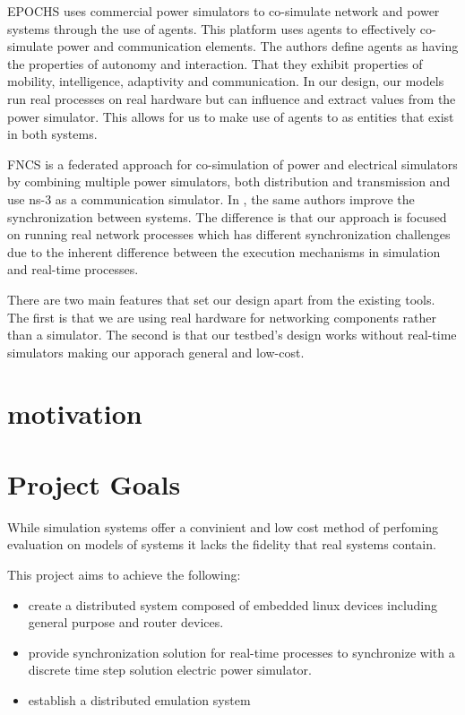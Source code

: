 EPOCHS \cite{EPOCHS} uses commercial power simulators to co-simulate network and power systems through the use of agents.
This platform uses agents to effectively co-simulate power and communication elements.
The authors define agents as having the properties of autonomy and interaction.
That they exhibit properties of mobility, intelligence, adaptivity and communication.
In our design, our models run real processes on real hardware but can influence and extract values from the power simulator.
This allows for us to make use of agents to as entities that exist in both systems.

FNCS \cite{FNCS} is a federated approach for co-simulation of power and electrical simulators by combining multiple power simulators, both distribution and transmission and use ns-3 as a communication simulator.
In \cite{FNCS-algos}, the same authors improve the synchronization between systems.
The difference is that our approach is focused on running real network processes which has different synchronization challenges due to the inherent difference between the execution mechanisms in simulation and real-time processes.

There are two main features that set our design apart from the existing tools.
The first is that we are using real hardware for networking components rather than a simulator.
The second is that our testbed's design works without real-time simulators making our apporach general and low-cost.



\section{motivation}
\label{motivation}
\fi


\section{Project Goals}

While simulation systems offer a convinient and low cost method of perfoming evaluation on models of systems it lacks the fidelity that real systems contain.

This project aims to achieve the following:
\begin{itemize}
  \item create a distributed system composed of embedded linux devices including general purpose and router devices.
  \item provide synchronization solution for real-time processes to synchronize with a discrete time step solution electric power simulator.
  \item establish a distributed emulation system
\end{itemize}


